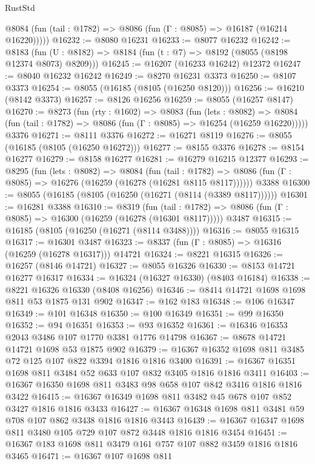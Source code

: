 \begin{lexlean}{RustStd}
\begin{coremodule}
      @8084 (fun (tail : @1782) => @8086 (fun (Γ : @8085) => @16187 (@16214 @16220)))))
@16232 := @8080 @16231
@16233 := @8077 @16232
@16242 := @8183
    (fun (U : @8182) => @8184 (fun (t : @7) => @8192 (@8055 (@8198 @12374 @8073) @8209)))
@16245 := @16207 (@16233 @16242) @12372
@16247 := @8040 @16232 @16242
@16249 := @8270 @16231 @3373
@16250 := @8107 @3373
@16254 := @8055 (@16185 (@8105 (@16250 @8120)))
@16256 := @16210 (@8142 @3373)
@16257 := @8126 @16256
@16259 := @8055 (@16257 @8147)
@16270 := @8273
    (fun (rty : @1602) =>
    @8083
      (fun (lets : @8082) =>
      @8084 (fun (tail : @1782) => @8086 (fun (Γ : @8085) => @16254 (@16259 @16220)))))
    @3376
@16271 := @8111 @3376
@16272 := @16271 @8119
@16276 := @8055 (@16185 (@8105 (@16250 @16272)))
@16277 := @8155 @3376
@16278 := @8154 @16277
@16279 := @8158 @16277
@16281 := @16279 @16215 @12377
@16293 := @8295
    (fun (lets : @8082) =>
    @8084
      (fun (tail : @1782) =>
      @8086 (fun (Γ : @8085) => @16276 (@16259 (@16278 (@16281 @8115 @8117))))))
    @3388
@16300 := @8055 (@16185 (@8105 (@16250 (@16271 (@8114 (@3389 @8117))))))
@16301 := @16281 @3388
@16310 := @8319
    (fun (tail : @1782) => @8086 (fun (Γ : @8085) => @16300 (@16259 (@16278 (@16301 @8117)))))
    @3487
@16315 := @16185 (@8105 (@16250 (@16271 (@8114 @3488))))
@16316 := @8055 @16315
@16317 := @16301 @3487
@16323 := @8337 (fun (Γ : @8085) => @16316 (@16259 (@16278 @16317))) @14721
@16324 := @8221 @16315
@16326 := @16257 (@8146 @14721)
@16327 := @8055 @16326
@16330 := @8153 @14721 @16277 @16317
@16334 := @16324 (@16327 @16330) (@8403 @16184)
@16338 := @8221 @16326 @16330 (@8408 @16256)
@16346 := @8414 @14721 @1698 @1698 @811 @53 @1875 @131 @902
@16347 := @162 @183
@16348 := @106 @16347
@16349 := @101 @16348
@16350 := @100 @16349
@16351 := @99 @16350
@16352 := @94 @16351
@16353 := @93 @16352
@16361 := @16346 @16353 @2043 @3486 @107 @1770 @3381 @1776 @14798
@16367 := @8678 @14721 @14721 @1698 @53 @1875 @902
@16379 := @16367 @16352 @1698 @811 @3485 @72 @125 @107 @822 @3394 @1816 @1816 @3400
@16391 := @16367 @16351 @1698 @811 @3484 @52 @633 @107 @832 @3405 @1816 @1816 @3411
@16403 := @16367 @16350 @1698 @811 @3483 @98 @658 @107 @842 @3416 @1816 @1816 @3422
@16415 := @16367 @16349 @1698 @811 @3482 @45 @678 @107 @852 @3427 @1816 @1816 @3433
@16427 := @16367 @16348 @1698 @811 @3481 @59 @708 @107 @862 @3438 @1816 @1816 @3443
@16439 := @16367 @16347 @1698 @811 @3480 @105 @729 @107 @872 @3448 @1816 @1816 @3454
@16451 := @16367 @183 @1698 @811 @3479 @161 @757 @107 @882 @3459 @1816 @1816 @3465
@16471 := @16367
    @107
    @1698
    @811

\end{coremodule}
\end{lexlean}
